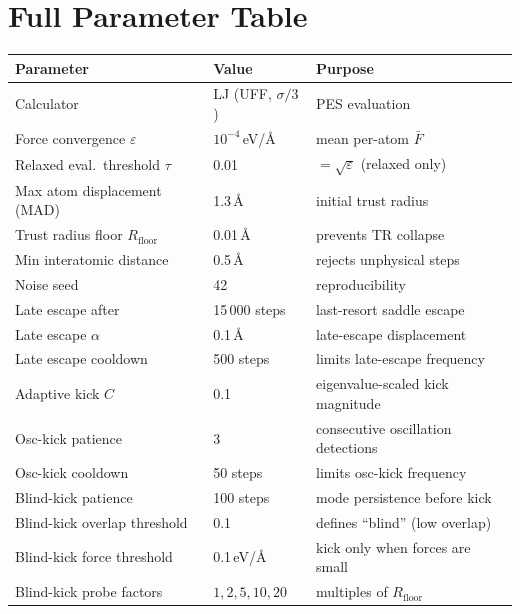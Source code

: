 \documentclass[11pt,a4paper]{article}
\theoremstyle{definition}
\begin{document}
\section{Full Parameter Table}
\label{app:params}

\begin{center}\small
\begin{tabular}{lll}
\toprule
Parameter & Value & Purpose \\
\midrule
Calculator & LJ (UFF, $\sigma/3$) & PES evaluation \\
Force convergence $\varepsilon$ & $10^{-4}$\,eV/\AA & mean per-atom $\bar{F}$ \\
Relaxed eval.\ threshold $\tau$ & 0.01 & $= \sqrt{\varepsilon}$ (relaxed only) \\
Max atom displacement (MAD) & 1.3\,\AA & initial trust radius \\
Trust radius floor $R_\text{floor}$ & 0.01\,\AA & prevents TR collapse \\
Min interatomic distance & 0.5\,\AA & rejects unphysical steps \\
Noise seed & 42 & reproducibility \\
Late escape after & 15\,000 steps & last-resort saddle escape \\
Late escape $\alpha$ & 0.1\,\AA & late-escape displacement \\
Late escape cooldown & 500 steps & limits late-escape frequency \\
Adaptive kick $C$ & 0.1 & eigenvalue-scaled kick magnitude \\
Osc-kick patience & 3 & consecutive oscillation detections \\
Osc-kick cooldown & 50 steps & limits osc-kick frequency \\
Blind-kick patience & 100 steps & mode persistence before kick \\
Blind-kick overlap threshold & 0.1 & defines ``blind'' (low overlap) \\
Blind-kick force threshold & 0.1\,eV/\AA & kick only when forces are small \\
Blind-kick probe factors & $1,2,5,10,20$ & multiples of $R_\text{floor}$ \\
\bottomrule
\end{tabular}
\end{center}

\end{document}
